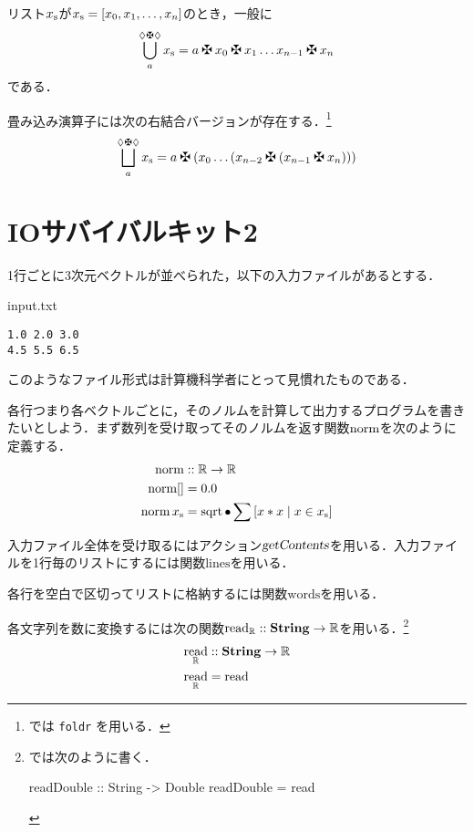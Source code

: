 \documentclass[platex,a5paper,twoside,fleqn,draft]{jsbook}
\begin{document}
リスト${x}_\mathrm{s}$が${x}_\mathrm{s}=[x_0,x_1,\dots,x_n]$のとき，一般に
\begin{equation}
\mathFold{a}{\mathAnonymousParameter\mathAnonymousOperator\mathAnonymousParameter}{\mathList{x}}
=a\mathAnonymousOperator x_0\mathAnonymousOperator x_1\dots x_{n-1}\mathAnonymousOperator x_n
\end{equation}
である．

畳み込み演算子には次の右結合バージョンが存在する．\footnote{\haskell では \verb|foldr| を用いる．}
\begin{equation}
\mathFoldRight{a}{\mathAnonymousParameter\mathAnonymousOperator\mathAnonymousParameter}{\mathList{x}}
=a\mathAnonymousOperator\left(x_0\dots\left(x_{n-2}\mathAnonymousOperator\left(x_{n-1}\mathAnonymousOperator x_n\right)\right)\right)
\end{equation}

\section{IOサバイバルキット2}

1行ごとに3次元ベクトルが並べられた，以下の入力ファイルがあるとする．
\begin{sourcecode}{input.txt}
\begin{verbatim}
1.0 2.0 3.0
4.5 5.5 6.5
\end{verbatim}
\end{sourcecode}
このようなファイル形式は計算機科学者にとって見慣れたものである．

各行つまり各ベクトルごとに，そのノルムを計算して出力するプログラムを書きたいとしよう．まず数列を受け取ってそのノルムを返す関数$\mathop{\textrm{norm}}$を次のように定義する．
\begin{align}
\mathop{\textrm{norm}}&::\mathord{\mathbb{R}}\rightarrow\mathord{\mathbb{R}}\\
\mathop{\textrm{norm}}[]&=0.0\\
\mathop{\textrm{norm}}{x}_\mathrm{s}&=\mathop{\textrm{sqrt}}\mathbin{\bullet}\sum\left[x*x\mid x\in{x}_\mathrm{s}\right]
\end{align}

入力ファイル全体を受け取るにはアクション$\textsl{getContents}$を用いる．入力ファイルを1行毎のリストにするには関数$\textrm{lines}$を用いる．

各行を空白で区切ってリストに格納するには関数$\textrm{words}$を用いる．

各文字列を数に変換するには次の関数$\mathop{\textrm{read}}_{\mathord{\mathbb{R}}}::\mathbf{String}\rightarrow\mathord{\mathbb{R}}$を用いる．\footnote{\haskell では次のように書く．
\begin{footcode}
      readDouble :: String -> Double
      readDouble = read
\end{footcode}}
\begin{align}
\mathop{\textrm{read}}_{\mathord{\mathbb{R}}}&::\mathbf{String}\rightarrow\mathord{\mathbb{R}}\\
\mathop{\textrm{read}}_{\mathord{\mathbb{R}}}&=\mathop{\textrm{read}}
\end{align}
\end{document}
